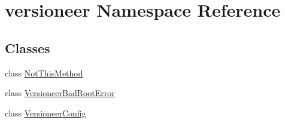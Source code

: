 \hypertarget{namespaceversioneer}{}\section{versioneer Namespace Reference}
\label{namespaceversioneer}
\subsection*{Classes}
\begin{DoxyCompactItemize}
\item 
class \hyperlink{classversioneer_1_1NotThisMethod}{Not\+This\+Method}
\item 
class \hyperlink{classversioneer_1_1VersioneerBadRootError}{Versioneer\+Bad\+Root\+Error}
\item 
class \hyperlink{classversioneer_1_1VersioneerConfig}{Versioneer\+Config}
\end{DoxyCompactItemize}
